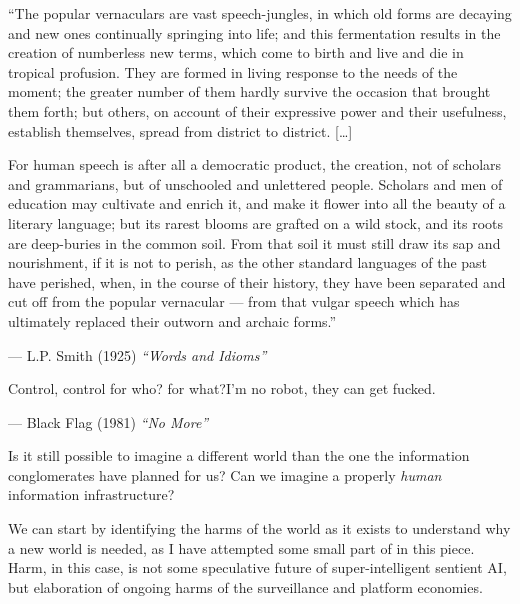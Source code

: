\begin{leftbar}
``The popular vernaculars are vast speech-jungles, in which old forms
are decaying and new ones continually springing into life; and this
fermentation results in the creation of numberless new terms, which come
to birth and live and die in tropical profusion. They are formed in
living response to the needs of the moment; the greater number of them
hardly survive the occasion that brought them forth; but others, on
account of their expressive power and their usefulness, establish
themselves, spread from district to district. {[}\ldots{]}

For human speech is after all a democratic product, the creation, not of
scholars and grammarians, but of unschooled and unlettered people.
Scholars and men of education may cultivate and enrich it, and make it
flower into all the beauty of a literary language; but its rarest blooms
are grafted on a wild stock, and its roots are deep-buries in the common
soil. From that soil it must still draw its sap and nourishment, if it
is not to perish, as the other standard languages of the past have
perished, when, in the course of their history, they have been separated
and cut off from the popular vernacular --- from that vulgar speech
which has ultimately replaced their outworn and archaic forms.''

--- L.P. Smith (1925) \emph{``Words and Idioms''} \cite{smithWordsIdiomsStudies1925} 
\end{leftbar}

\begin{leftbar}
Control, control for who? for what?I'm no robot, they can get fucked.

--- Black Flag (1981) \emph{``No More''}
\end{leftbar}

Is it still possible to imagine a different world than the one the
information conglomerates have planned for us? Can we imagine a properly
\emph{human} information infrastructure?

We can start by identifying the harms of the world as it exists to
understand why a new world is needed, as I have attempted some small
part of in this piece. Harm, in this case, is not some speculative
future of super-intelligent sentient AI, but elaboration of ongoing
harms of the surveillance and platform economies.

